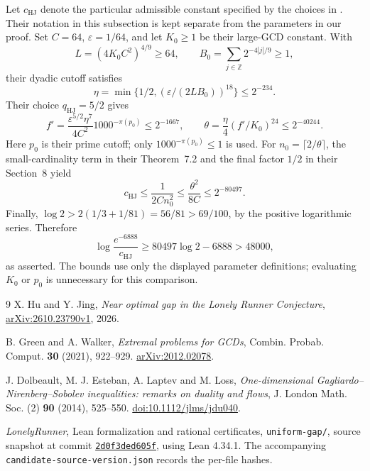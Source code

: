 \documentclass[11pt,a4paper]{article}
\begin{document}
Let \(c_{\mathrm{HJ}}\) denote the particular admissible constant specified
by the choices in \cite[Theorem~7.2 and Section~8]{HuJing}. Their notation
in this subsection is kept separate from the parameters in our proof.
Set \(C=64\), \(\varepsilon=1/64\), and let \(K_0\ge1\) be their
large-GCD constant. With
\[
 L=(4K_0C^2)^{4/9}\ge64,\qquad
 B_0=\sum_{j\in\mathbb Z}2^{-4|j|/9}\ge1,
\]
their dyadic cutoff satisfies
\[
 \eta=\min\{1/2,(\varepsilon/(2LB_0))^{18}\}
       \le 2^{-234}.
\]
Their choice \(q_{\mathrm{HJ}}=5/2\) gives
\[
 f'=\frac{\varepsilon^{5/2}\eta^7}{4C^2}
                  1000^{-\pi(p_0)}\le2^{-1667},\qquad
 \theta=\frac{\eta}{4}(f'/K_0)^{24}\le2^{-40244}.
\]
Here \(p_0\) is their prime cutoff; only
\(1000^{-\pi(p_0)}\le1\) is used. For
\(n_0=\lceil2/\theta\rceil\), the small-cardinality term in their
Theorem~7.2 and the final factor \(1/2\) in their Section~8 yield
\[
 c_{\mathrm{HJ}}\le\frac1{2Cn_0^2}
       \le\frac{\theta^2}{8C}\le2^{-80497}.
\]
Finally,
\(\log2>2(1/3+1/81)=56/81>69/100\), by the positive logarithmic
series. Therefore
\[
 \log\frac{e^{-6888}}{c_{\mathrm{HJ}}}
 \ge80497\log2-6888>48000,
\]
as asserted. The bounds use only the displayed parameter definitions;
evaluating \(K_0\) or \(p_0\) is unnecessary for this comparison.

\begin{thebibliography}{9}
X. Hu and Y. Jing,
\emph{Near optimal gap in the Lonely Runner Conjecture},
\href{https://arxiv.org/abs/2610.23790v1}{arXiv:2610.23790v1}, 2026.

B. Green and A. Walker,
\emph{Extremal problems for GCDs},
Combin. Probab. Comput. \textbf{30} (2021), 922--929.
\href{https://arxiv.org/abs/2012.02078}{arXiv:2012.02078}.

J. Dolbeault, M. J. Esteban, A. Laptev and M. Loss,
\emph{One-dimensional Gagliardo--Nirenberg--Sobolev inequalities:
remarks on duality and flows},
J. London Math. Soc. (2) \textbf{90} (2014), 525--550.
\href{https://doi.org/10.1112/jlms/jdu040}{doi:10.1112/jlms/jdu040}.

\emph{LonelyRunner}, Lean formalization and rational certificates,
\texttt{uniform-gap/}, source snapshot at commit
\href{https://github.com/Orc-Lee-Chem/LonelyRunner/tree/2d0f3ded605f4929e0313fa4edc362064c3a1bd6/uniform-gap}{\texttt{2d0f3ded605f}},
using Lean 4.34.1. The accompanying
\texttt{candidate-source-version.json} records the per-file hashes.
\end{thebibliography}
\end{document}
